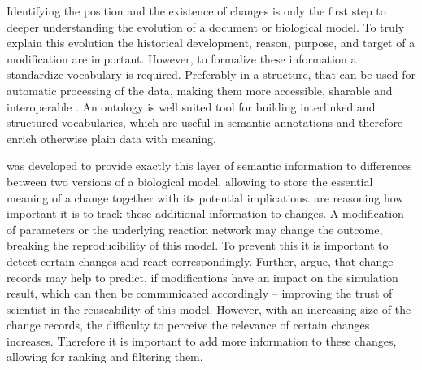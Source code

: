 	Identifying the position and the existence of changes is only the first step to deeper understanding the evolution of a document or biological model. To truly explain this evolution the historical development, reason, purpose, and target of a modification are important. 
	However, to formalize these information a standardize vocabulary is required. Preferably in a structure, that can be used for automatic processing of the data, making them more accessible, sharable and interoperable \citep{Scharm2016}.
	An ontology is well suited tool for building interlinked and structured vocabularies, which are useful in semantic annotations and therefore enrich otherwise plain data with meaning.
	
	\comodi was developed to provide exactly this layer of semantic information to differences between two versions of a biological model, allowing to store the essential meaning of a change together with its potential implications.
	\citeauthor{Scharm2016} are reasoning how important it is to track these additional information to changes. A modification of parameters or the underlying reaction network may change the outcome, breaking the reproducibility of this model. To prevent this it is important to detect certain changes and react correspondingly.
	Further, \citeauthor{Scharm2016} argue, that change records may help to predict, if modifications have an impact on the simulation result, which can then be communicated accordingly -- improving the trust of scientist in the reuseability of this model.
	However, with an increasing size of the change records, the difficulty to perceive the relevance of certain changes increases. Therefore it is important to add more information to these changes, allowing for ranking and filtering them.
	
